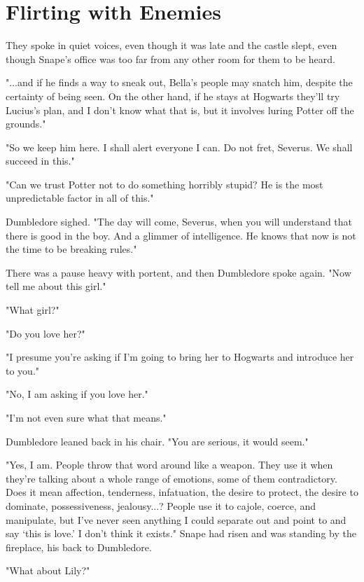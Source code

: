 
\chapter{Flirting with Enemies}

They spoke in quiet voices, even though it was late and the castle slept, even though Snape's office was too far from any other room for them to be heard.

"...and if he finds a way to sneak out, Bella's people may snatch him, despite the certainty of being seen. On the other hand, if he stays at Hogwarts they'll try Lucius's plan, and I don't know what that is, but it involves luring Potter off the grounds."

"So we keep him here. I shall alert everyone I can. Do not fret, Severus. We shall succeed in this."

"Can we trust Potter not to do something horribly stupid? He is the most unpredictable factor in all of this."

Dumbledore sighed. "The day will come, Severus, when you will understand that there is good in the boy. And a glimmer of intelligence. He knows that now is not the time to be breaking rules."

There was a pause heavy with portent, and then Dumbledore spoke again. "Now tell me about this girl."

"What girl?"

"Do you love her?"

"I presume you're asking if I'm going to bring her to Hogwarts and introduce her to you."

"No, I am asking if you love her."

"I'm not even sure what that means."

Dumbledore leaned back in his chair. "You are serious, it would seem."

"Yes, I am. People throw that word around like a weapon. They use it when they're talking about a whole range of emotions, some of them contradictory. Does it mean affection, tenderness, infatuation, the desire to protect, the desire to dominate, possessiveness, jealousy...? People use it to cajole, coerce, and manipulate, but I've never seen anything I could separate out and point to and say `this is love.' I don't think it exists." Snape had risen and was standing by the fireplace, his back to Dumbledore.

"What about Lily?"

